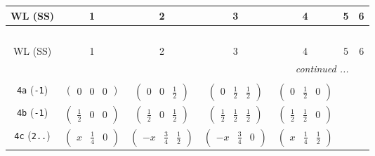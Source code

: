 \documentclass[fleqn,9pt,landscape]{jsarticle}
\begin{document}
\begin{center}
\renewcommand{\arraystretch}{1.2}
\begin{longtable}{ccccccc}
 \hline \hline
WL (SS) & 1 & 2 & 3 & 4 & 5 & 6 \\ \hline \endfirsthead

\multicolumn{6}{l}{\tablename\ \thetable{}} \\
 \hline \hline
WL (SS) & 1 & 2 & 3 & 4 & 5 & 6 \\ \hline \endhead

 \hline \hline
\multicolumn{6}{r}{\footnotesize\it continued ...} \\ \endfoot

 \hline \hline
\multicolumn{6}{r}{} \\ \endlastfoot

{\tt 4a} ({\tt -1}) & $ \begin{pmatrix} 0 & 0 & 0 \end{pmatrix} $ & $ \begin{pmatrix} 0 & 0 & \frac{1}{2} \end{pmatrix} $ & $ \begin{pmatrix} 0 & \frac{1}{2} & \frac{1}{2} \end{pmatrix} $ & $ \begin{pmatrix} 0 & \frac{1}{2} & 0 \end{pmatrix} $ & $  $ & $  $ \\ \hline
{\tt 4b} ({\tt -1}) & $ \begin{pmatrix} \frac{1}{2} & 0 & 0 \end{pmatrix} $ & $ \begin{pmatrix} \frac{1}{2} & 0 & \frac{1}{2} \end{pmatrix} $ & $ \begin{pmatrix} \frac{1}{2} & \frac{1}{2} & \frac{1}{2} \end{pmatrix} $ & $ \begin{pmatrix} \frac{1}{2} & \frac{1}{2} & 0 \end{pmatrix} $ & $  $ & $  $ \\ \hline
{\tt 4c} ({\tt 2..}) & $ \begin{pmatrix} x & \frac{1}{4} & 0 \end{pmatrix} $ & $ \begin{pmatrix} - x & \frac{3}{4} & \frac{1}{2} \end{pmatrix} $ & $ \begin{pmatrix} - x & \frac{3}{4} & 0 \end{pmatrix} $ & $ \begin{pmatrix} x & \frac{1}{4} & \frac{1}{2} \end{pmatrix} $ & $  $ & $  $ \\ \hline

\end{longtable}
\end{center}
\end{document}
